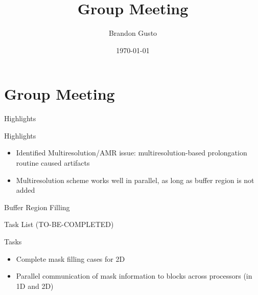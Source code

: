\documentclass{beamer}
\begin{document}
  \section{Group Meeting}
  \title{Group Meeting}
  \author{Brandon Gusto}

  \date{\today}
  \frame{\titlepage}

  \begin{frame}{Highlights}
    \begin{block}{Highlights }
      \begin{itemize}
        \setlength\itemsep{1em}
        \item Identified Multiresolution/AMR issue: multiresolution-based prolongation routine
            caused artifacts
        \item Multiresolution scheme works well in parallel, as long as buffer region is not added
      \end{itemize}
    \end{block}
  \end{frame}

  \begin{frame}
    \begin{figure}
      \center
    \end{figure}
  \end{frame}

  \begin{frame}{Buffer Region Filling}
    \begin{figure}
      
    \end{figure}
  \end{frame}

  \begin{frame}{Task List (TO-BE-COMPLETED)}
    \begin{block}{Tasks}
      \begin{itemize}
        \setlength\itemsep{1em}
        \item Complete mask filling cases for 2D
        \item Parallel communication of mask information to blocks across processors (in 1D and 2D)
      \end{itemize}
    \end{block}
  \end{frame}
\end{document}

